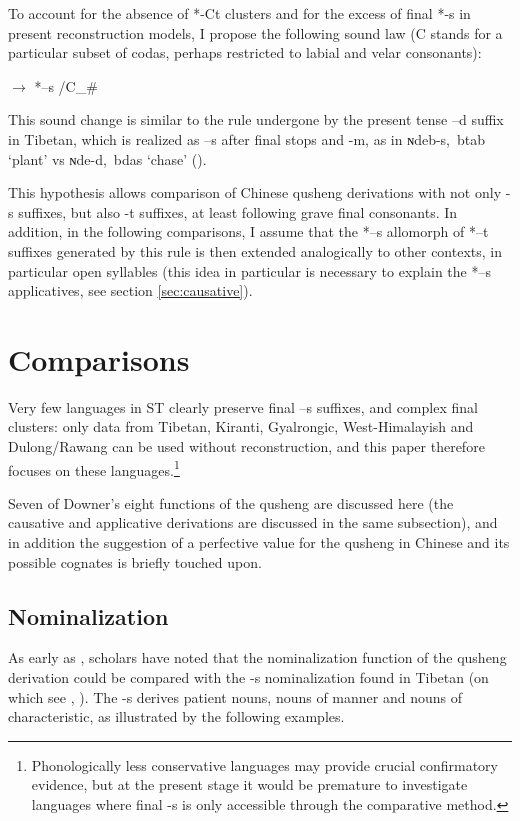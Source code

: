\documentclass[oldfontcommands,oneside,a4paper,11pt]{article}
\newcommand{\ipa}[1]{{\phon \mbox{#1}}} %
\begin{document}
To account for the absence of *-Ct clusters and for the excess of final *-s in present reconstruction models, I propose the following sound law (C stands for a particular subset of codas, perhaps restricted to labial and velar consonants):

\begin{exe}
\ex \label{ex:ts}
\glt *\ipa{--t} $\rightarrow$ *\ipa{--s} /C\_\# 
\end{exe}

This sound change is similar to the rule undergone by the present tense \ipa{--d} suffix in Tibetan, which is realized as \ipa{--s} after final stops and \ipa{-m}, as in \ipa{ɴdeb-s, btab}   `plant' vs \ipa{ɴde-d, bdas}   `chase' (\citealt[52-53]{coblin76}). 

This hypothesis allows comparison of Chinese qusheng derivations with not only \ipa{-s} suffixes, but also \ipa{-t} suffixes, at least following grave final consonants. In addition, in the following comparisons, I assume that the *\ipa{--s} allomorph of *\ipa{--t} suffixes generated by this rule is then extended analogically to other contexts, in particular open syllables (this idea in particular is necessary to explain the *\ipa{--s} applicatives, see section \ref{sec:causative}).


\section{Comparisons}

Very few languages in ST clearly preserve final \ipa{--s} suffixes, and complex final clusters: only data from Tibetan, Kiranti, Gyalrongic, West-Himalayish and Dulong/Rawang can be used without reconstruction, and this paper therefore focuses on these languages.\footnote{Phonologically less conservative languages may provide crucial confirmatory evidence, but at the present stage it would be premature to investigate languages where final \ipa{-s} is only accessible through the comparative method. }

Seven of Downer's eight functions of the qusheng are discussed here (the causative and applicative derivations are discussed in the same subsection), and in addition the suggestion of a perfective value for the qusheng in Chinese and its possible cognates is briefly touched upon.

\subsection{Nominalization} \label{sec:nmlz}
As early as \citet{forrest60occlusives}, scholars have noted that the nominalization function of the qusheng derivation could be compared with the \ipa{-s} nominalization found in Tibetan (on which see \citealt[43]{conrady1896}, \citealt[624-5]{hill14derivational}). The \ipa{-s} derives patient nouns, nouns of manner and nouns of characteristic, as illustrated by the following examples. 
\end{document}
